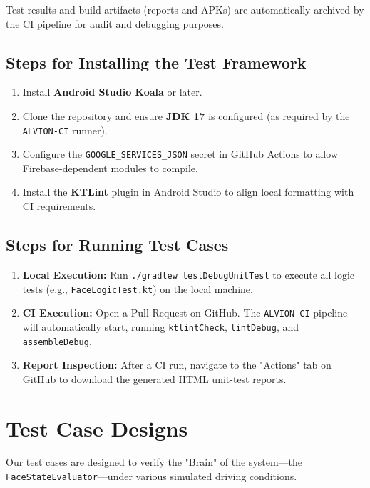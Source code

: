 \documentclass[11pt]{report}
\begin{document}
Test results and build artifacts (reports and APKs) are automatically archived by the CI pipeline for audit and debugging purposes.

\subsection{Steps for Installing the Test Framework}  %

\begin{enumerate}
    \item Install \textbf{Android Studio Koala} or later.
    \item Clone the repository and ensure \textbf{JDK 17} is configured (as required by the \texttt{ALVION-CI} runner).
    \item Configure the \texttt{GOOGLE\_SERVICES\_JSON} secret in GitHub Actions to allow Firebase-dependent modules to compile.
    \item Install the \textbf{KTLint} plugin in Android Studio to align local formatting with CI requirements.
\end{enumerate}

\subsection{Steps for Running Test Cases}  %

\begin{enumerate}
    \item \textbf{Local Execution:} Run \texttt{./gradlew testDebugUnitTest} to execute all logic tests (e.g., \texttt{FaceLogicTest.kt}) on the local machine.
    \item \textbf{CI Execution:} Open a Pull Request on GitHub. The \texttt{ALVION-CI} pipeline will automatically start, running \texttt{ktlintCheck}, \texttt{lintDebug}, and \texttt{assembleDebug}.
    \item \textbf{Report Inspection:} After a CI run, navigate to the "Actions" tab on GitHub to download the generated HTML unit-test reports.
\end{enumerate}

\section{Test Case Designs}  %

Our test cases are designed to verify the "Brain" of the system—the \texttt{FaceStateEvaluator}—under various simulated driving conditions.
\end{document}
